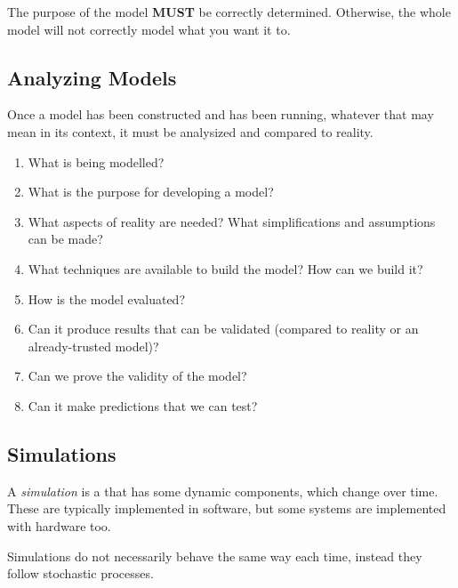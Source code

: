 The purpose of the model \textbf{MUST} be correctly determined.
Otherwise, the whole model will not correctly model what you want it to.

\subsection{Analyzing Models}\label{subsec:Model_Analysis}
Once a model has been constructed and has been running, whatever that may mean in its context, it must be analysized and compared to reality.
\begin{enumerate}[noitemsep]
\item What is being modelled?
\item What is the purpose for developing a model?
\item What aspects of reality are needed? What simplifications and assumptions can be made?
\item What techniques are available to build the model? How can we build it?
\item How is the model evaluated?
\item Can it produce results that can be validated (compared to reality or an already-trusted model)?
\item Can we prove the validity of the model?
\item Can it make predictions that we can test?
\end{enumerate}

\subsection{Simulations}\label{subsec:Simulations}
\begin{definition}[Simulation]\label{def:Simulation}
  A \emph{simulation} is a  that has some dynamic components, which change over time.
  These are typically implemented in software, but some systems are implemented with hardware too.

  \begin{remark}\label{rmk:Stochastic_Simulations}
    Simulations do not necessarily behave the same way each time, instead they follow stochastic processes.
  \end{remark}
\end{definition}

